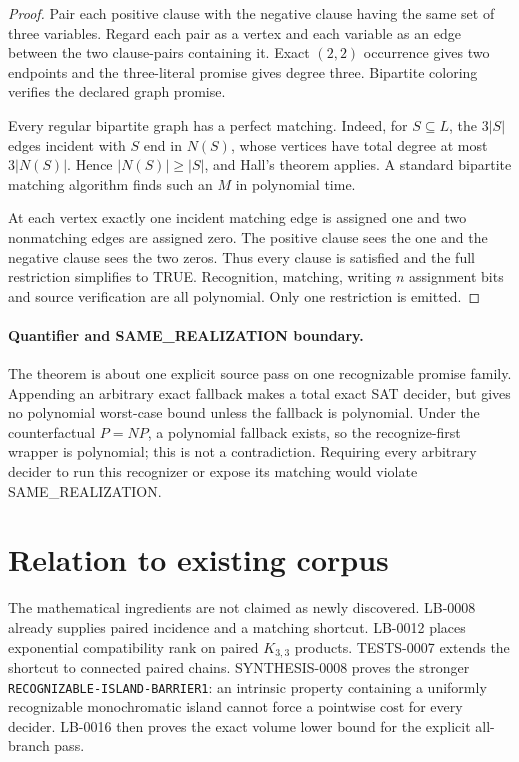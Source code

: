 \documentclass[11pt]{article}
\begin{document}
\begin{proof}
Pair each positive clause with the negative clause having the same set of
three variables.  Regard each pair as a vertex and each variable as an edge
between the two clause-pairs containing it.  Exact $(2,2)$ occurrence gives
two endpoints and the three-literal promise gives degree three.  Bipartite
coloring verifies the declared graph promise.

Every regular bipartite graph has a perfect matching.  Indeed, for
$S\subseteq L$, the $3|S|$ edges incident with $S$ end in $N(S)$, whose
vertices have total degree at most $3|N(S)|$.  Hence
$|N(S)|\ge |S|$, and Hall's theorem applies.  A standard bipartite
matching algorithm finds such an $M$ in polynomial time.

At each vertex exactly one incident matching edge is assigned one and two
nonmatching edges are assigned zero.  The positive clause sees the one and
the negative clause sees the two zeros.  Thus every clause is satisfied and
the full restriction simplifies to TRUE.  Recognition, matching, writing
$n$ assignment bits and source verification are all polynomial.  Only one
restriction is emitted.
\end{proof}

\paragraph{Quantifier and SAME\_REALIZATION boundary.}
The theorem is about one explicit source pass on one recognizable promise
family.  Appending an arbitrary exact fallback makes a total exact SAT
decider, but gives no polynomial worst-case bound unless the fallback is
polynomial.  Under the counterfactual $P=NP$, a polynomial fallback exists,
so the recognize-first wrapper is polynomial; this is not a contradiction.
Requiring every arbitrary decider to run this recognizer or expose its
matching would violate SAME\_REALIZATION.

\section{Relation to existing corpus}

The mathematical ingredients are not claimed as newly discovered.
LB-0008 already supplies paired incidence and a matching shortcut.
LB-0012 places exponential compatibility rank on paired $K_{3,3}$ products.
TESTS-0007 extends the shortcut to connected paired chains.
SYNTHESIS-0008 proves the stronger
\texttt{RECOGNIZABLE-ISLAND-BARRIER1}: an intrinsic property containing a
uniformly recognizable monochromatic island cannot force a pointwise cost
for every decider.  LB-0016 then proves the exact volume lower bound for the
explicit all-branch pass.
\end{document}
